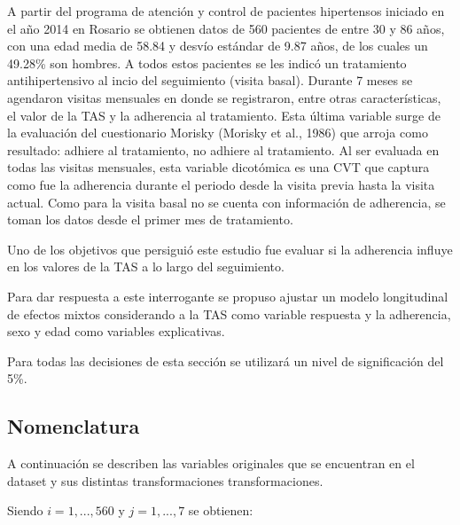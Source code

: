 \documentclass[spanish]{article}
\numberwithin{figure}{subsection}
\numberwithin{equation}{subsection}
\numberwithin{table}{subsection}
\def\npatients{560}
\begin{document}
A partir del programa de atención y control de pacientes hipertensos iniciado en
el año 2014 en Rosario se obtienen datos de \npatients{} pacientes de entre 30 y
86 años, con una edad media de 58.84 y desvío estándar de 9.87 años, de los
cuales un 49.28\% son hombres. A todos estos pacientes se les indicó un
tratamiento antihipertensivo al incio del seguimiento (visita basal). Durante 7
meses se agendaron visitas mensuales en donde se registraron, entre otras
características, el valor de la TAS y la adherencia al tratamiento. Esta última
variable surge de la evaluación del cuestionario Morisky (Morisky et al., 1986)
que arroja como resultado: adhiere al tratamiento, no adhiere al tratamiento. Al
ser evaluada en todas las visitas mensuales, esta variable dicotómica es una CVT
que captura como fue la adherencia durante el periodo desde la visita previa
hasta la visita actual. Como para la visita basal no se cuenta con información
de adherencia, se toman los datos desde el primer mes de tratamiento.

Uno de los objetivos que persiguió este estudio fue evaluar si la adherencia
influye en los valores de la TAS a lo largo del seguimiento.

Para dar respuesta a este interrogante se propuso ajustar un modelo longitudinal
de efectos mixtos considerando a la TAS como variable respuesta y la adherencia,
sexo y edad como variables explicativas.

Para todas las decisiones de esta sección se utilizará un nivel de significación
del 5\%.

\subsection{Nomenclatura}
\label{variables}

A continuación se describen las variables originales que se encuentran en el
dataset y sus distintas transformaciones transformaciones.

Siendo $ i = 1, ..., \npatients{}$ y $j = 1, ..., 7$ se obtienen:
\end{document}

